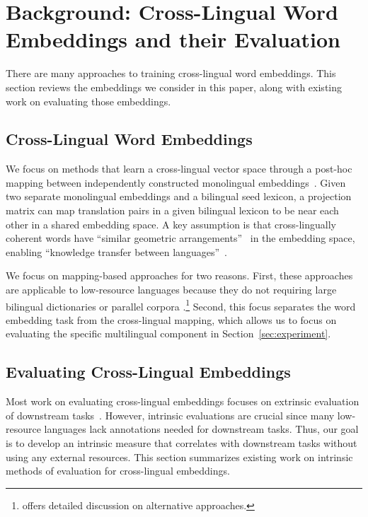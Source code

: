 \section{Background: Cross-Lingual Word Embeddings and their Evaluation}
\label{sec:diagnosis}

There are many approaches to training cross-lingual word embeddings.
This section reviews the embeddings we consider in this paper,
along with existing work on evaluating those embeddings.


\subsection{Cross-Lingual Word Embeddings}

We focus on methods that learn a cross-lingual vector space through a post-hoc mapping between independently constructed
monolingual embeddings~\citep{DBLP:journals/corr/MikolovLS13,vulic-korhonen-acl:2016c}.
Given two separate monolingual embeddings and a bilingual seed
lexicon, a projection matrix can map translation pairs in a given
bilingual lexicon to be near each other in a shared embedding space.
A key assumption is that cross-lingually coherent words have ``similar
geometric arrangements''~\citep{DBLP:journals/corr/MikolovLS13}
in the embedding space, enabling ``knowledge transfer between
languages''~\citep{DBLP:journals/corr/Ruder17}. 

We focus on mapping-based approaches for two reasons.  First, these approaches are
applicable to low-resource languages because they do not requiring
large bilingual dictionaries or parallel corpora
\citep{artetxe-labaka-agirre:2017:Long,lample2018word}.\footnote{\citet{DBLP:journals/corr/Ruder17}
  offers detailed discussion on alternative approaches. }
Second, this focus separates the word embedding task from the cross-lingual
mapping, which allows us to focus on evaluating the specific
multilingual component in Section~\ref{sec:experiment}.


\subsection{Evaluating Cross-Lingual Embeddings}

Most work on evaluating cross-lingual embeddings
 focuses on extrinsic evaluation of downstream tasks~\citep{upadhyay-EtAl:2016,glavas2019properly}.
However, intrinsic evaluations are crucial since many low-resource languages
lack annotations needed for downstream tasks.
Thus, our goal is to develop an intrinsic measure that correlates
with downstream tasks without using any external resources.
This section summarizes existing work on intrinsic methods of evaluation for cross-lingual embeddings.

